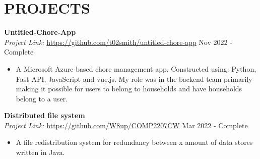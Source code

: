 \section*{PROJECTS}
\noindent
\textbf{Untitled-Chore-App} \\ %
\textit{Project Link:} \url{https://github.com/t02smith/untitled-chore-app} \hfill Nov 2022 - Complete
\begin{itemize}
    \item A Microsoft Azure based chore management app. Constructed using: Python, Fast API, JavaScript and vue.js. My role was in the backend team primarily making it possible for users to belong to households and have households belong to a user.
\end{itemize}


\noindent
\textbf{Distributed file system}\\
\textit{Project Link:} \url{https://github.com/W8up/COMP2207CW} \hfill Mar 2022 - Complete
\begin{itemize}
    \item A file redistribution system for redundancy between x amount of data stores written in Java.
\end{itemize}